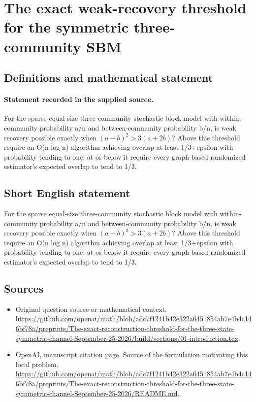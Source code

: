 \documentclass[11pt]{article}
\begin{document}
\section*{The exact weak-recovery threshold for the symmetric three-community SBM}\label{statement}
\subsection{Definitions and mathematical statement}
\paragraph{Statement recorded in the supplied source.}
For the sparse equal-size three-community stochastic block model with within-community probability a/n and between-community probability b/n, is weak recovery possible exactly when $(a-b)^2>3(a+2b)$? Above this threshold require an O(n log n) algorithm achieving overlap at least 1/3+epsilon with probability tending to one; at or below it require every graph-based randomized estimator’s expected overlap to tend to 1/3.
\subsection{Short English statement}
For the sparse equal-size three-community stochastic block model with within-community probability a/n and between-community probability b/n, is weak recovery possible exactly when $(a-b)^2>3(a+2b)$? Above this threshold require an O(n log n) algorithm achieving overlap at least 1/3+epsilon with probability tending to one; at or below it require every graph-based randomized estimator’s expected overlap to tend to 1/3.
\subsection{Sources}
\begin{itemize}
\item[S1] Original question source or mathematical context.
\url{https://github.com/openai/math/blob/adc7f1241b42e322a6451854ab7e4b4c146bf78a/preprints/The-exact-reconstruction-threshold-for-the-three-state-symmetric-channel-September-25-2026/build/sections/01-introduction.tex}.
\item[S2] OpenAI, manuscript citation page. Source of the formulation motivating this local problem.
\url{https://github.com/openai/math/blob/adc7f1241b42e322a6451854ab7e4b4c146bf78a/preprints/The-exact-reconstruction-threshold-for-the-three-state-symmetric-channel-September-25-2026/README.md}.
\end{itemize}
\end{document}
